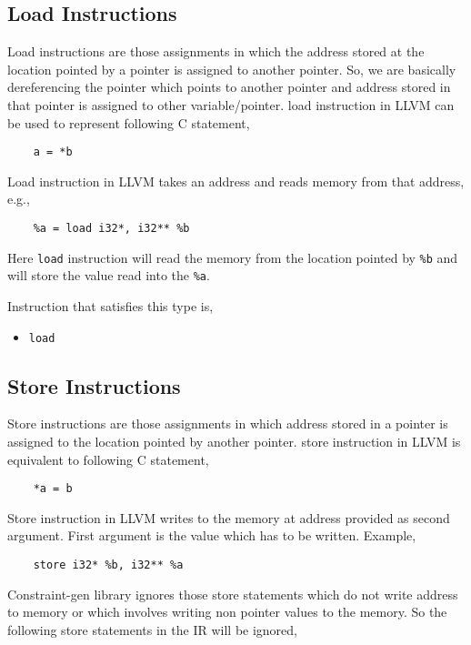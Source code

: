 \documentclass[a4paper,11pt]{report}
\begin{document}
\subsection{Load Instructions}
Load instructions are those assignments in which the address stored at the 
location pointed by a pointer is assigned to another pointer. So, we are 
basically dereferencing the pointer which points to another pointer and address 
stored in that pointer is assigned to other variable/pointer.
load instruction in LLVM can be used to represent following C statement,
\begin{lstlisting}
    a = *b
\end{lstlisting}

\noindent
Load instruction in LLVM takes an address and reads memory from that address,
e.g.,

\begin{lstlisting}
    %a = load i32*, i32** %b
\end{lstlisting}

\noindent
Here \texttt{load} instruction will read the memory from the location pointed 
by \texttt{\%b} and will store the value read into the \texttt{\%a}.

\noindent
Instruction that satisfies this type is,
\begin{itemize}
 \item \texttt{load}
\end{itemize}


\subsection{Store Instructions}
Store instructions are those assignments in which address stored in a pointer 
is assigned to the location pointed by another pointer.
store instruction in LLVM is equivalent to following C statement,
\begin{lstlisting}
    *a = b
\end{lstlisting}

\noindent
Store instruction in LLVM writes to the memory at address provided as second
argument. First argument is the value which has to be written.
Example,
\begin{lstlisting}
    store i32* %b, i32** %a
\end{lstlisting}

\noindent
Constraint-gen library ignores those store statements which do not write address
to memory or which involves writing non pointer values to the memory. So the
following store statements in the IR will be ignored,
\end{document}
